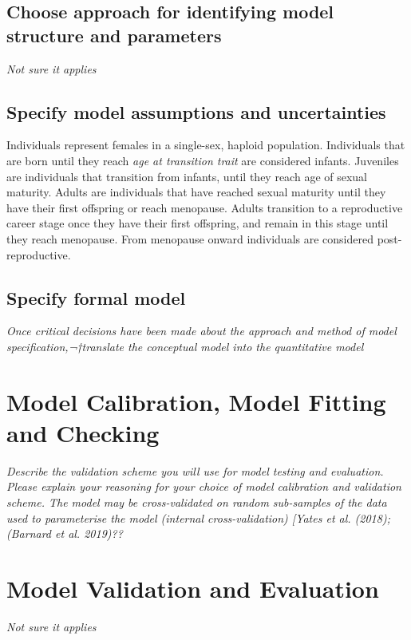 \documentclass{article}
\begin{document}
\subsection{Choose approach for identifying model structure and parameters}

\emph{Not sure it applies}

\subsection{Specify model assumptions and uncertainties}

Individuals represent females in a single-sex, haploid population. Individuals that are born until they reach \emph{age at transition trait} are considered infants. Juveniles are individuals that transition from infants, until they reach age of sexual maturity. Adults are individuals that have reached sexual maturity until they have their first offspring or reach menopause. Adults transition to a reproductive career stage once they have their first offspring, and remain in this stage until they reach menopause. From menopause onward individuals are considered post-reproductive.

\subsection{Specify formal model}

\emph{Once critical decisions have been made about the approach and method of model specification,¬†translate the conceptual model into the quantitative model}

\section{Model Calibration, Model Fitting and Checking}

\emph{Describe the validation scheme you will use for model testing and evaluation. Please explain your reasoning for your choice of model calibration and validation scheme. The model may be cross-validated on random sub-samples of the data used to parameterise the model (internal cross-validation) [Yates et al. (2018);(Barnard et al. 2019)??}

\section{Model Validation and Evaluation}

\emph{Not sure it applies}
\end{document}
